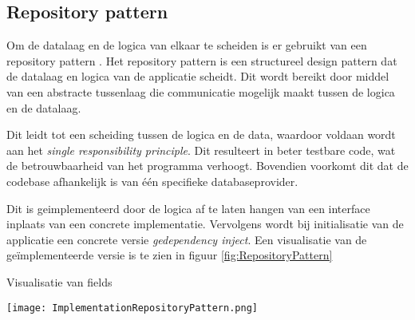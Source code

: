 \subsection{Repository pattern}
Om de datalaag en de logica van elkaar te scheiden is er gebruikt van een repository pattern \parencite{RepositoryPattern}.
Het repository pattern is een structureel design pattern dat de datalaag en logica van de applicatie scheidt.
Dit wordt bereikt door middel van een abstracte tussenlaag die communicatie mogelijk maakt tussen de logica en de datalaag.

\whitespace
Dit leidt tot een scheiding tussen de logica en de data, waardoor voldaan wordt aan het \textit{single responsibility principle}.
Dit resulteert in beter testbare code, wat de betrouwbaarheid van het programma verhoogt.
Bovendien voorkomt dit dat de codebase afhankelijk is van één specifieke databaseprovider.

\whitespace
Dit is geimplementeerd door de logica af te laten hangen van een interface inplaats van een concrete implementatie.
Vervolgens wordt bij initialisatie van de applicatie  een concrete versie \textit{gedependency inject}.
Een visualisatie van de geïmplementeerde versie is te zien in figuur \ref{fig:RepositoryPattern}

\whitespace[2]
\begin{graphic}
    \captionsetup{type=figure}
    \caption{Visualisatie van fields}
    \texttt{[image: ImplementationRepositoryPattern.png]}
    \label{fig:RepositoryPattern}
\end{graphic}
